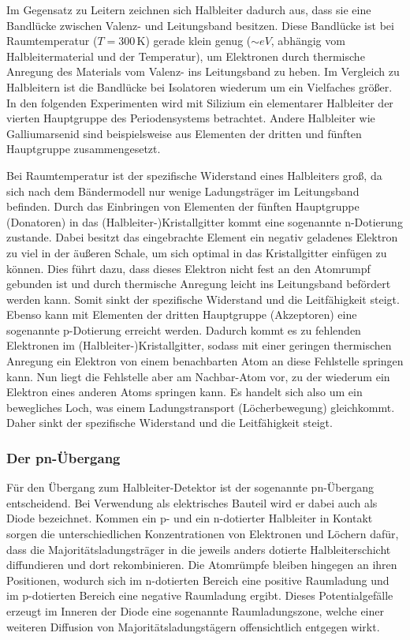 Im Gegensatz zu Leitern zeichnen sich Halbleiter dadurch aus, dass sie eine Bandlücke zwischen Valenz- und Leitungsband besitzen.
Diese Bandlücke ist bei Raumtemperatur ($T=300\,$K) gerade klein genug ($\sim eV$, abhängig vom Halbleitermaterial und der Temperatur), um Elektronen durch thermische Anregung des Materials vom Valenz- ins Leitungsband zu heben.
Im Vergleich zu Halbleitern ist die Bandlücke bei Isolatoren wiederum um ein Vielfaches größer.
In den folgenden Experimenten wird mit Silizium ein elementarer Halbleiter der vierten Hauptgruppe des Periodensystems betrachtet.
Andere Halbleiter wie Galliumarsenid sind beispielsweise aus Elementen der dritten und fünften Hauptgruppe zusammengesetzt.

Bei Raumtemperatur ist der spezifische Widerstand eines Halbleiters groß, da sich nach dem Bändermodell nur wenige Ladungsträger im Leitungsband befinden.
Durch das Einbringen von Elementen der fünften Hauptgruppe (Donatoren) in das (Halbleiter-)Kristallgitter kommt eine sogenannte n-Dotierung zustande.
Dabei besitzt das eingebrachte Element ein negativ geladenes Elektron zu viel in der äußeren Schale, um sich optimal in das Kristallgitter einfügen zu können.
Dies führt dazu, dass dieses Elektron nicht fest an den Atomrumpf gebunden ist und durch thermische Anregung leicht ins Leitungsband befördert werden kann.
Somit sinkt der spezifische Widerstand und die Leitfähigkeit steigt.
Ebenso kann mit Elementen der dritten Hauptgruppe (Akzeptoren) eine sogenannte p-Dotierung erreicht werden.
Dadurch kommt es zu fehlenden Elektronen im (Halbleiter-)Kristallgitter, sodass mit einer geringen thermischen Anregung ein Elektron von einem benachbarten Atom an diese Fehlstelle springen kann.
Nun liegt die Fehlstelle aber am Nachbar-Atom vor, zu der wiederum ein Elektron eines anderen Atoms springen kann.
Es handelt sich also um ein \glqq bewegliches Loch\grqq , was einem Ladungstransport (\glqq Löcherbewegung\grqq ) gleichkommt.
Daher sinkt der spezifische Widerstand und die Leitfähigkeit steigt.


\subsubsection{Der pn-Übergang}

Für den Übergang zum Halbleiter-Detektor ist der sogenannte pn-Übergang entscheidend. Bei Verwendung als elektrisches Bauteil wird er dabei auch als Diode bezeichnet. Kommen ein p- und ein n-dotierter Halbleiter in Kontakt sorgen die unterschiedlichen Konzentrationen von Elektronen und Löchern dafür, dass die Majoritätsladungsträger in die jeweils anders dotierte Halbleiterschicht diffundieren und dort rekombinieren. Die Atomrümpfe bleiben hingegen an ihren Positionen, wodurch sich im n-dotierten Bereich eine positive Raumladung und im p-dotierten Bereich eine negative Raumladung ergibt. Dieses Potentialgefälle erzeugt im Inneren der Diode eine sogenannte Raumladungszone, welche einer weiteren Diffusion von Majoritätsladungstägern offensichtlich entgegen wirkt.

